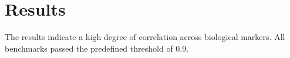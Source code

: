 \section{Results}
The results indicate a high degree of correlation across biological markers. All benchmarks passed the predefined threshold of 0.9.
